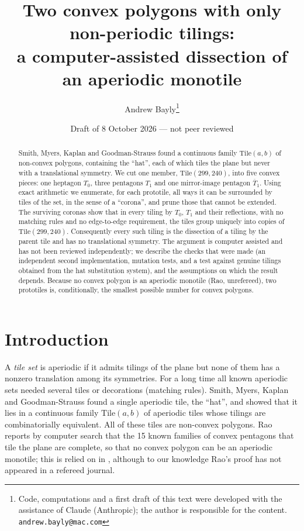 \documentclass[11pt]{article}
\title{Two convex polygons with only non-periodic tilings:\\ a computer-assisted dissection of an aperiodic monotile}
\author{Andrew Bayly\thanks{Code, computations and a first draft of this text were developed with the assistance of Claude (Anthropic); the author is responsible for the content. \texttt{andrew.bayly@mac.com}}}
\date{Draft of 8 October 2026 --- not peer reviewed}
\theoremstyle{remark}
\newcommand{\Tz}{T_0}
\newcommand{\To}{T_1}
\newcommand{\Tob}{\overline{T}_1}
\begin{document}
\maketitle

\begin{abstract}
Smith, Myers, Kaplan and Goodman-Strauss found a continuous family $\mathrm{Tile}(a,b)$ of non-convex polygons, containing the ``hat'', each of which tiles the plane but never with a translational symmetry. We cut one member, $\mathrm{Tile}(299,240)$, into five convex pieces: one heptagon $\Tz$, three pentagons $\To$ and one mirror-image pentagon $\Tob$. Using exact arithmetic we enumerate, for each prototile, all ways it can be surrounded by tiles of the set, in the sense of a ``corona'', and prune those that cannot be extended. The surviving coronas show that in every tiling by $\Tz$, $\To$ and their reflections, with no matching rules and no edge-to-edge requirement, the tiles group uniquely into copies of $\mathrm{Tile}(299,240)$. Consequently every such tiling is the dissection of a tiling by the parent tile and has no translational symmetry. The argument is computer assisted and has not been reviewed independently; we describe the checks that were made (an independent second implementation, mutation tests, and a test against genuine tilings obtained from the hat substitution system), and the assumptions on which the result depends. Because no convex polygon is an aperiodic monotile (Rao, unrefereed), two prototiles is, conditionally, the smallest possible number for convex polygons.
\end{abstract}

\section{Introduction}

A \emph{tile set} is aperiodic if it admits tilings of the plane but none of them has a nonzero translation among its symmetries. For a long time all known aperiodic sets needed several tiles or decorations (matching rules). Smith, Myers, Kaplan and Goodman-Strauss \cite{SMKG24} found a single aperiodic tile, the ``hat'', and showed that it lies in a continuous family $\mathrm{Tile}(a,b)$ of aperiodic tiles whose tilings are combinatorially equivalent. All of these tiles are non-convex polygons. Rao \cite{Rao17} reports by computer search that the 15 known families of convex pentagons that tile the plane are complete, so that no convex polygon can be an aperiodic monotile; this is relied on in \cite{SMKG24}, although to our knowledge Rao's proof has not appeared in a refereed journal.
\end{document}
